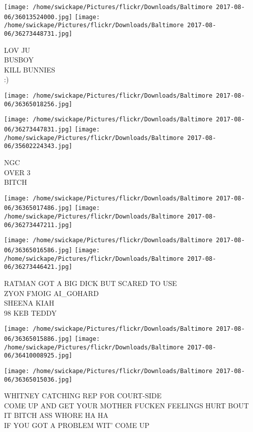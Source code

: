 \documentclass[10pt,letterpaper]{article}
\begin{document}
\texttt{[image: /home/swickape/Pictures/flickr/Downloads/Baltimore 2017-08-06/36013524000.jpg]}
\texttt{[image: /home/swickape/Pictures/flickr/Downloads/Baltimore 2017-08-06/36273448731.jpg]}

LOV JU\\
BUSBOY\\
KILL BUNNIES\\
:)\\
\pagebreak

\texttt{[image: /home/swickape/Pictures/flickr/Downloads/Baltimore 2017-08-06/36365018256.jpg]}

\vspace{0.25in}
\texttt{[image: /home/swickape/Pictures/flickr/Downloads/Baltimore 2017-08-06/36273447831.jpg]}
\texttt{[image: /home/swickape/Pictures/flickr/Downloads/Baltimore 2017-08-06/35602224343.jpg]}

NGC\\
OVER 3\\
BITCH\\
\pagebreak

\texttt{[image: /home/swickape/Pictures/flickr/Downloads/Baltimore 2017-08-06/36365017486.jpg]}
\texttt{[image: /home/swickape/Pictures/flickr/Downloads/Baltimore 2017-08-06/36273447211.jpg]}

\texttt{[image: /home/swickape/Pictures/flickr/Downloads/Baltimore 2017-08-06/36365016586.jpg]}
\texttt{[image: /home/swickape/Pictures/flickr/Downloads/Baltimore 2017-08-06/36273446421.jpg]}

RATMAN GOT A BIG DICK BUT SCARED TO USE\\
ZYON FMOIG AI\_GOHARD\\
SHEENA KIAH\\
98 KEB TEDDY\\
\pagebreak

\texttt{[image: /home/swickape/Pictures/flickr/Downloads/Baltimore 2017-08-06/36365015886.jpg]}
\texttt{[image: /home/swickape/Pictures/flickr/Downloads/Baltimore 2017-08-06/36410008925.jpg]}

\vspace{0.25in}
\texttt{[image: /home/swickape/Pictures/flickr/Downloads/Baltimore 2017-08-06/36365015036.jpg]}

WHITNEY CATCHING REP FOR COURT{-}SIDE\\
COME UP AND GET YOUR MOTHER FUCKEN FEELINGS HURT BOUT IT BITCH ASS WHORE HA HA\\
IF YOU GOT A PROBLEM WIT' COME UP\\
\pagebreak
\end{document}
